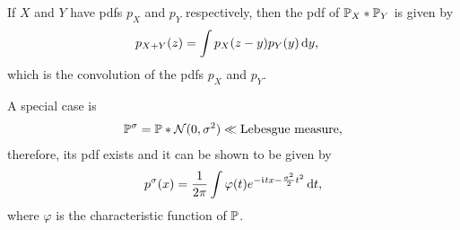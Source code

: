 \documentclass[12pt]{article}
\begin{document}
If $X$ and $Y$ have pdfs $p_X$ and $p_Y$ respectively, then the pdf of $\P_X *\P_Y$ is given by 
\begin{align*}
p_{X+Y}(z)	& = \int p_X(z-y)	p_Y(y) \,\mathrm{d} y,
\end{align*}
which is the convolution of the pdfs $p_X$ and $p_Y$. 

A special case is
\begin{align*}
\P^{\sigma}= {\P} * \calN (0,\sigma^2)\ll \text{Lebesgue measure}, 
\end{align*}
therefore, its pdf exists and it can be shown to be given by 
\begin{align}\label{wk10:psigma}
p^{\sigma}(x)=\frac{1}{2\pi}\int \varphi(t) e^{-\mathfrak{i}\mkern1mu tx-\frac{\sigma^2}{2}t^2} \,\mathrm{d} t,
\end{align}
where $\varphi$ is the characteristic function of $\P$.
\end{document}
